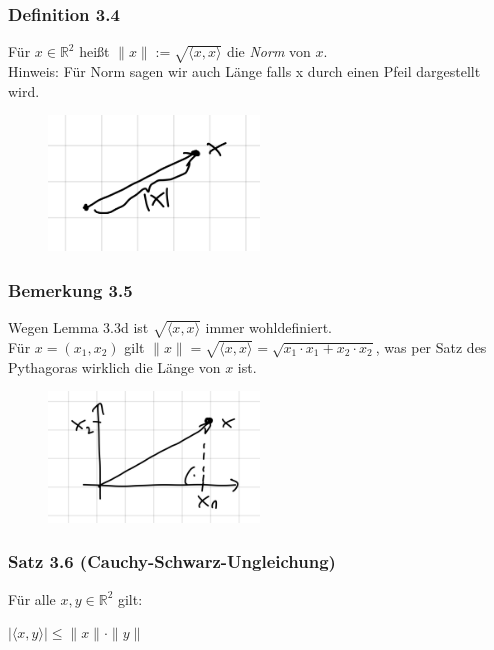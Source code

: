 \documentclass{article}
\begin{document}
\subsubsection*{Definition 3.4}
Für $x \in \mathbb{R}^2$ heißt $\|x\| := \sqrt{\langle x,x \rangle}$ die \textit{Norm} von $x$. \\
Hinweis: Für Norm sagen wir auch Länge falls x durch einen Pfeil dargestellt wird. \\

\begin{figure}[h]
    \centering
    \includegraphics[width=0.5\textwidth]{Images/3.4.jpeg}

\end{figure}

\subsubsection*{Bemerkung 3.5}
Wegen Lemma 3.3d ist $\sqrt{\langle x,x \rangle}$ immer wohldefiniert. \\
Für $x=(x_1, x_2)$ gilt $\|x\| = \sqrt{\langle x,x \rangle} = \sqrt{x_1 \cdot x_1 + x_2 \cdot x_2}$, was per Satz des Pythagoras wirklich die Länge von $x$ ist. \\

\begin{figure}[h]
    \centering
    \includegraphics[width=0.5\textwidth]{Images/3.5.jpeg}

\end{figure}

\subsubsection*{Satz 3.6 (Cauchy-Schwarz-Ungleichung)}
Für alle $x,y \in \mathbb{R}^2$ gilt: \\
\begin{center}
    $|\langle x,y \rangle| \leq \|x\| \cdot \|y\|$
\end{center}
\end{document}
